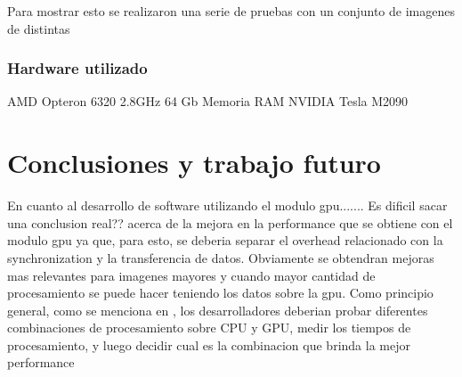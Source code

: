 \documentclass[a4paper,10pt]{report}
\begin{document}
Para mostrar esto se realizaron una serie de pruebas con un conjunto de imagenes de distintas 

\begin{figure}[!ht]
\begin{center}
\end{center}
\label{sizeevstime}
\end{figure}






\subsection{Hardware utilizado}


AMD Opteron 6320  2.8GHz 
64 Gb Memoria RAM
NVIDIA Tesla M2090 

\chapter{Conclusiones y trabajo futuro}



En cuanto al desarrollo de software utilizando el modulo gpu.......
Es dificil sacar una conclusion   real??  acerca de la mejora en la performance que se obtiene con el modulo gpu ya que, para esto, se deberia separar el overhead relacionado con la synchronization y la transferencia de datos.
Obviamente se obtendran mejoras mas relevantes para imagenes mayores y cuando mayor cantidad de procesamiento se puede hacer teniendo los datos sobre la gpu.
Como principio general, como se menciona en  \cite{pulli2012real}  , los desarrolladores deberian probar diferentes combinaciones de procesamiento sobre CPU y GPU, medir los tiempos de procesamiento, y luego decidir cual es la combinacion que brinda la mejor performance
\end{document}
